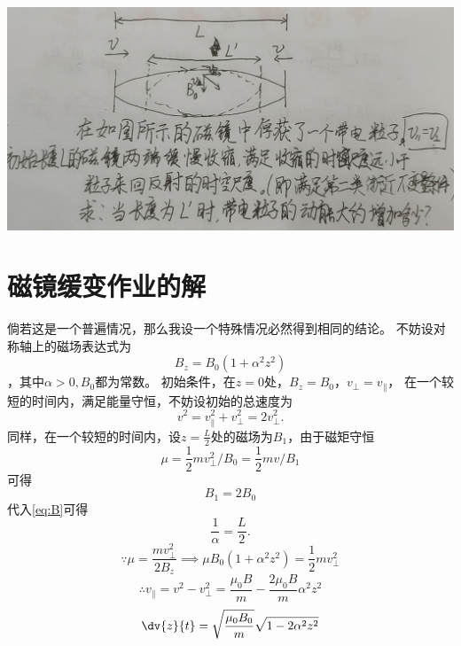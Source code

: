 
\includegraphics[width=\textwidth]{figures/2022-10-21T120911+0800.png}
\section{磁镜缓变作业的解}
倘若这是一个普遍情况，那么我设一个特殊情况必然得到相同的结论。
不妨设对称轴上的磁场表达式为
\begin{equation}
B_z = B_0 (1 + \alpha^2 z^2)
\label{eq:B}
\end{equation}
，其中\(\alpha>0, B_0\)都为常数。
初始条件，在\(z=0\)处，\(B_z = B_0\)，\( v_\perp = v_\parallel\)，
在一个较短的时间内，满足能量守恒，不妨设初始的总速度为
\begin{equation}
  v^2 = v_\parallel^2 + v_\perp^2 = 2 v_\perp^2.
\end{equation}
同样，在一个较短的时间内，设\(z=\frac{L}{2}\)处的磁场为\(B_1\)，由于磁矩守恒
\begin{equation}
  \mu = \frac{1}{2} m v_\perp^2 \big/ B_0 =
\frac{1}{2} m v \big/ B_1 
\end{equation}
可得
\begin{equation}
  B_1 = 2 B_0
\end{equation}
代入\cref{eq:B}可得
\begin{equation}
  \frac{1}{\alpha} = \frac{L}{2}.
  \label{eq:L}
\end{equation}
\begin{equation}
 \because \mu = \frac{m v_\perp^2}{2 B_z} \implies \mu B_0 ( 1 + \alpha^2 z^2 ) = \frac{1}{2} m v_\perp^2
\end{equation}
\begin{equation}
  \therefore v_\parallel = v^2 - v_\perp^2 = \frac{\mu_0 B}{m} - \frac{2 \mu_0 B}{m} \alpha^2 z^2
\end{equation}
\begin{equation}
  \dv{z}{t} = \sqrt{\frac{\mu_0 B_0}{m}} \sqrt{1 - 2 \alpha^2 z^2}
\end{equation}
